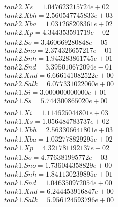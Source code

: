 \begin{align*}
    tank2.Xs = 1.047623215724e+02\\
    tank2.Xbh = 2.560547745833e+03\\
    tank2.Xba = 1.031268208361e+02\\
    tank2.Xp = 4.344353591719e+02\\
    tank2.So = 3.460669280848e-05\\
    tank2.Sno = 2.374326657217e-01\\
    tank2.Snh = 1.943283861745e+01\\
    tank2.Snd = 3.395010672094e-01\\
    tank2.Xnd = 6.666141082522e+00\\
    tank2.Salk = 6.077331022060e+00\\
    tank1.Si = 3.000000000000e+01\\
    tank1.Ss = 5.744300865020e+00\\
\end{align*}
\begin{align*}
    tank1.Xi = 1.114625044801e+03\\
    tank1.Xs = 1.056484783737e+02\\
    tank1.Xbh = 2.563306641801e+03\\
    tank1.Xba = 1.032778829295e+02\\
    tank1.Xp = 4.321781192137e+02\\
    tank1.So = 4.776381995772e-03\\
    tank1.Sno = 1.736044358829e+00\\
    tank1.Snh = 1.841130239895e+01\\
    tank1.Snd = 1.046350972054e+00\\
    tank1.Xnd = 6.244453916847e+00\\
    tank1.Salk = 5.956124593796e+00\\
\end{align*}
